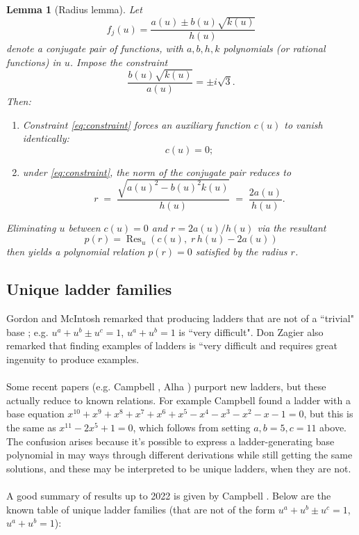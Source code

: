 \documentclass[12pt]{article}
\newtheorem{lemma}{Lemma}%
\begin{document}
\begin{lemma}[Radius lemma]\label{lem:radius}
Let
\begin{equation*}
    f_j(u) = \frac{a(u) \pm b(u)\sqrt{k(u)}}{h(u)}
\end{equation*}
denote a conjugate pair of functions, with $a, b, h, k$ polynomials (or rational functions) in $u$. Impose the constraint
\begin{equation}\label{eq:constraint}
    \frac{b(u)\sqrt{k(u)}}{a(u)} = \pm i\sqrt{3}.
\end{equation}
Then:
\begin{enumerate}
    \item[(i)] Constraint \eqref{eq:constraint} forces an auxiliary function $c(u)$ to vanish identically:
    \begin{equation*}
        c(u) = 0;
    \end{equation*}
    \item[(ii)] under \eqref{eq:constraint}, the norm of the conjugate pair reduces to
    \begin{equation*}
        r \;=\; \frac{\sqrt{a(u)^2 - b(u)^2 k(u)}}{h(u)} \;=\; \frac{2a(u)}{h(u)}.
    \end{equation*}
\end{enumerate}
Eliminating $u$ between $c(u) = 0$ and $r = 2a(u)/h(u)$ via the resultant
\begin{equation*}
    p(r) = \operatorname{Res}_u\!\left(c(u),\; r\,h(u) - 2a(u)\right)
\end{equation*}
then yields a polynomial relation $p(r) = 0$ satisfied by the radius $r$.
\end{lemma}


\subsection{Unique ladder families}

 Gordon and McIntosh \cite{GordonMcIntosh1997} remarked that producing ladders that are not of a ``trivial" base ; e.g.  $u^a+u^b\pm u^c=1$,  $u^a+u^b=1$ is ``very difficult".  Don Zagier\cite{Zagier1991} also remarked that finding examples of ladders is ``very difficult and requires great ingenuity to produce examples.
 \\
 \\
 Some recent papers (e.g. Campbell \cite{Campbell2025}, Alha \cite{Alha2025}) purport new ladders, but these actually reduce to known relations. For example Campbell found a ladder with a base equation $x^{10}+x^9+x^8+x^7+x^6+x^5-x^4-x^3-x^2-x-1=0$, but this is the same as $x^{11}-2x^5+1=0$, which follows from setting $a,b=5, c=11$ above. The confusion arises because it's possible to express a ladder-generating base polynomial in may ways through different derivations while still getting the same solutions, and these may be interpreted to be unique ladders, when they are not. 
 \\
 \\
 A good summary of results up to 2022 is given by Campbell \cite{Campbell2025}. \noindent Below are the known table of unique ladder families (that are not of the form $u^a+u^b\pm u^c=1$,  $u^a+u^b=1$):
\end{document}
